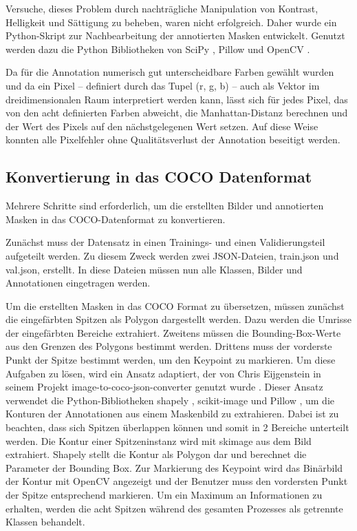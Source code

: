 Versuche, dieses Problem durch nachträgliche Manipulation von Kontrast, Helligkeit und Sättigung zu beheben, waren nicht erfolgreich. Daher wurde ein Python-Skript zur Nachbearbeitung der annotierten Masken entwickelt.
Genutzt werden dazu die Python Bibliotheken von SciPy \cite{2020SciPy-NMeth}, Pillow \cite{clark2015pillow} und OpenCV \cite{opencv_library}.

Da für die Annotation numerisch gut unterscheidbare Farben gewählt wurden und da ein Pixel – definiert durch das Tupel (r, g, b) – auch als Vektor im dreidimensionalen Raum interpretiert werden kann, lässt sich für jedes Pixel, das von den acht definierten Farben abweicht, die Manhattan-Distanz berechnen und der Wert des Pixels auf den nächstgelegenen Wert setzen.
Auf diese Weise konnten alle Pixelfehler ohne Qualitätsverlust der Annotation beseitigt werden.

\subsection{Konvertierung in das COCO Datenformat}
Mehrere Schritte sind erforderlich, um die erstellten Bilder und annotierten Masken in das COCO-Datenformat zu konvertieren.

Zunächst muss der Datensatz in einen Trainings- und einen Validierungsteil aufgeteilt werden. Zu diesem Zweck werden zwei JSON-Dateien, train.json und val.json, erstellt. In diese Dateien müssen nun alle Klassen, Bilder und Annotationen eingetragen werden.

Um die erstellten Masken in das COCO Format zu übersetzen, müssen zunächst die eingefärbten Spitzen als Polygon dargestellt werden. Dazu werden die Umrisse der eingefärbten Bereiche extrahiert. Zweitens müssen die Bounding-Box-Werte aus den Grenzen des Polygons bestimmt werden. Drittens muss der vorderste Punkt der Spitze bestimmt werden, um den Keypoint zu markieren.
Um diese Aufgaben zu lösen, wird ein Ansatz adaptiert, der von Chris Eijgenstein in seinem Projekt image-to-coco-json-converter genutzt wurde \cite{chriscoco}. Dieser Ansatz verwendet die Python-Bibliotheken shapely \cite{shapely2007}, scikit-image \cite{van2014scikit} und Pillow \cite{clark2015pillow}, um die Konturen der Annotationen aus einem Maskenbild zu extrahieren. Dabei ist zu beachten, dass sich Spitzen überlappen können und somit in 2 Bereiche unterteilt werden. Die Kontur einer Spitzeninstanz wird mit skimage aus dem Bild extrahiert. Shapely stellt die Kontur als Polygon dar und berechnet die Parameter der Bounding Box.
Zur Markierung des Keypoint wird das Binärbild der Kontur mit OpenCV \cite{opencv_library} angezeigt und der Benutzer muss den vordersten Punkt der Spitze entsprechend markieren.
Um ein Maximum an Informationen zu erhalten, werden die acht Spitzen während des gesamten Prozesses als getrennte Klassen behandelt.

